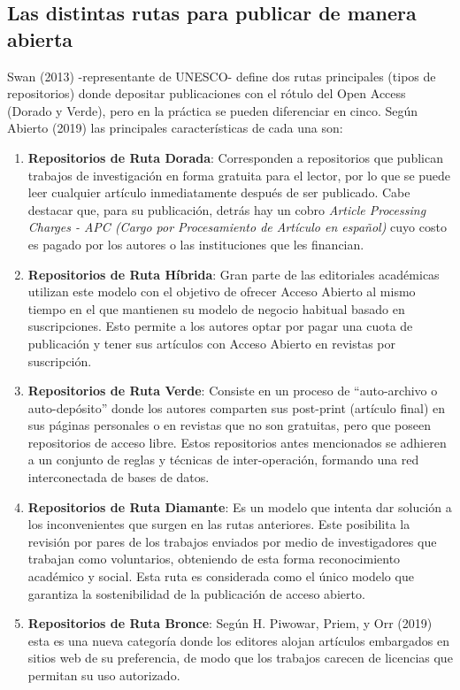 \documentclass[
  spanish,
  letterpaper,
  DIV=11,
  numbers=noendperiod]{scrreprt}
\begin{document}
\subsection{Las distintas rutas para publicar de manera
abierta}\label{las-distintas-rutas-para-publicar-de-manera-abierta}

Swan (2013) -representante de UNESCO- define dos rutas principales
(tipos de repositorios) donde depositar publicaciones con el rótulo del
Open Access (Dorado y Verde), pero en la práctica se pueden diferenciar
en cinco. Según Abierto (2019) las principales características de cada
una son:

\begin{enumerate}
\def\labelenumi{\arabic{enumi}.}
\item
  \textbf{Repositorios de Ruta Dorada}: Corresponden a repositorios que
  publican trabajos de investigación en forma gratuita para el lector,
  por lo que se puede leer cualquier artículo inmediatamente después de
  ser publicado. Cabe destacar que, para su publicación, detrás hay un
  cobro \emph{Article Processing Charges - APC (Cargo por Procesamiento
  de Artículo en español)} cuyo costo es pagado por los autores o las
  instituciones que les financian.
\item
  \textbf{Repositorios de Ruta Híbrida}: Gran parte de las editoriales
  académicas utilizan este modelo con el objetivo de ofrecer Acceso
  Abierto al mismo tiempo en el que mantienen su modelo de negocio
  habitual basado en suscripciones. Esto permite a los autores optar por
  pagar una cuota de publicación y tener sus artículos con Acceso
  Abierto en revistas por suscripción.
\item
  \textbf{Repositorios de Ruta Verde}: Consiste en un proceso de
  ``auto-archivo o auto-depósito'' donde los autores comparten sus
  post-print (artículo final) en sus páginas personales o en revistas
  que no son gratuitas, pero que poseen repositorios de acceso libre.
  Estos repositorios antes mencionados se adhieren a un conjunto de
  reglas y técnicas de inter-operación, formando una red interconectada
  de bases de datos.
\item
  \textbf{Repositorios de Ruta Diamante}: Es un modelo que intenta dar
  solución a los inconvenientes que surgen en las rutas anteriores. Este
  posibilita la revisión por pares de los trabajos enviados por medio de
  investigadores que trabajan como voluntarios, obteniendo de esta forma
  reconocimiento académico y social. Esta ruta es considerada como el
  único modelo que garantiza la sostenibilidad de la publicación de
  acceso abierto.
\item
  \textbf{Repositorios de Ruta Bronce}: Según H. Piwowar, Priem, y Orr
  (2019) esta es una nueva categoría donde los editores alojan artículos
  embargados en sitios web de su preferencia, de modo que los trabajos
  carecen de licencias que permitan su uso autorizado.
\end{enumerate}
\end{document}
